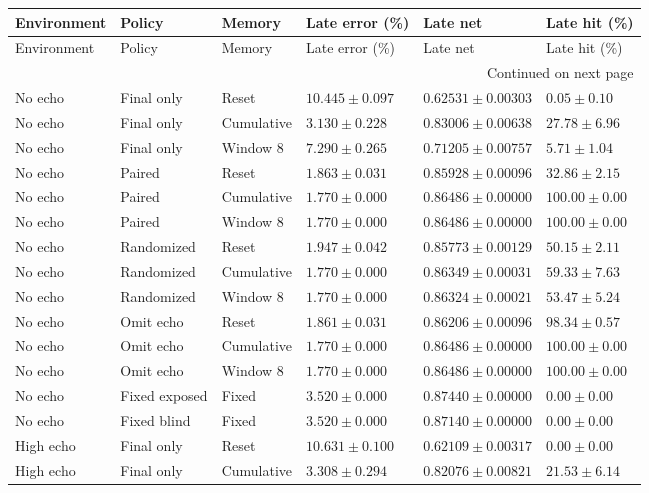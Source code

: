 \begin{longtable}{@{}llllll@{}}
\toprule Environment & Policy & Memory & Late error (\%) & Late net & Late hit (\%) \\\midrule\endfirsthead
\toprule Environment & Policy & Memory & Late error (\%) & Late net & Late hit (\%) \\\midrule\endhead
\midrule\multicolumn{6}{r}{Continued on next page}\\\endfoot
\bottomrule\endlastfoot
No echo & Final only & Reset & $10.445 \pm 0.097$ & $0.62531 \pm 0.00303$ & $0.05 \pm 0.10$ \\
No echo & Final only & Cumulative & $3.130 \pm 0.228$ & $0.83006 \pm 0.00638$ & $27.78 \pm 6.96$ \\
No echo & Final only & Window 8 & $7.290 \pm 0.265$ & $0.71205 \pm 0.00757$ & $5.71 \pm 1.04$ \\
No echo & Paired & Reset & $1.863 \pm 0.031$ & $0.85928 \pm 0.00096$ & $32.86 \pm 2.15$ \\
No echo & Paired & Cumulative & $1.770 \pm 0.000$ & $0.86486 \pm 0.00000$ & $100.00 \pm 0.00$ \\
No echo & Paired & Window 8 & $1.770 \pm 0.000$ & $0.86486 \pm 0.00000$ & $100.00 \pm 0.00$ \\
No echo & Randomized & Reset & $1.947 \pm 0.042$ & $0.85773 \pm 0.00129$ & $50.15 \pm 2.11$ \\
No echo & Randomized & Cumulative & $1.770 \pm 0.000$ & $0.86349 \pm 0.00031$ & $59.33 \pm 7.63$ \\
No echo & Randomized & Window 8 & $1.770 \pm 0.000$ & $0.86324 \pm 0.00021$ & $53.47 \pm 5.24$ \\
No echo & Omit echo & Reset & $1.861 \pm 0.031$ & $0.86206 \pm 0.00096$ & $98.34 \pm 0.57$ \\
No echo & Omit echo & Cumulative & $1.770 \pm 0.000$ & $0.86486 \pm 0.00000$ & $100.00 \pm 0.00$ \\
No echo & Omit echo & Window 8 & $1.770 \pm 0.000$ & $0.86486 \pm 0.00000$ & $100.00 \pm 0.00$ \\
No echo & Fixed exposed & Fixed & $3.520 \pm 0.000$ & $0.87440 \pm 0.00000$ & $0.00 \pm 0.00$ \\
No echo & Fixed blind & Fixed & $3.520 \pm 0.000$ & $0.87140 \pm 0.00000$ & $0.00 \pm 0.00$ \\
High echo & Final only & Reset & $10.631 \pm 0.100$ & $0.62109 \pm 0.00317$ & $0.00 \pm 0.00$ \\
High echo & Final only & Cumulative & $3.308 \pm 0.294$ & $0.82076 \pm 0.00821$ & $21.53 \pm 6.14$ \\

\end{longtable}
